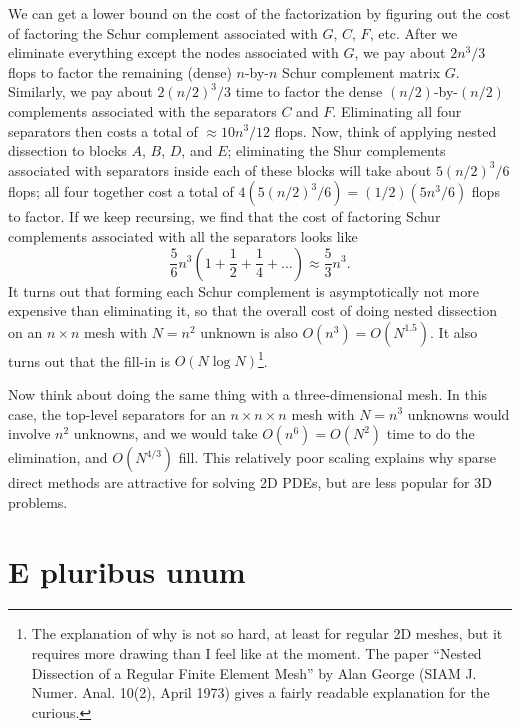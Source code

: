\documentclass[12pt, leqno]{article}
\begin{document}
We can get a lower bound on the cost of the factorization by figuring
out the cost of factoring the Schur complement associated with $G$,
$C$, $F$, etc.  After we eliminate everything except the nodes
associated with $G$, we pay about $2n^3/3$ flops to factor the
remaining (dense) $n$-by-$n$ Schur complement matrix $G$.  Similarly,
we pay about $2(n/2)^3/3$ time to factor the dense $(n/2)$-by-$(n/2)$
complements associated with the separators $C$ and $F$.  Eliminating
all four separators then costs a total of $\approx 10n^3/12$ flops.
Now, think of applying nested dissection to blocks $A$, $B$, $D$, and
$E$; eliminating the Shur complements associated with separators
inside each of these blocks will take about $5(n/2)^3/6$ flops; all
four together cost a total of $4 ( 5(n/2)^3/6 )= (1/2) 
(5n^3/6)$ flops to factor.  If we keep recursing, we find that the
cost of factoring Schur complements associated with all the separators
looks like
\[
  \frac{5}{6} n^3 \left( 1 + \frac{1}{2} + \frac{1}{4} + \ldots \right)
  \approx \frac{5}{3}n^3.
\]
It turns out that forming each Schur complement is asymptotically not
more expensive than eliminating it, so that the overall cost of doing 
nested dissection on an $n \times n$ mesh with $N = n^2$ unknown is also
$O(n^3) = O(N^{1.5})$.  It also turns out that the fill-in is 
$O(N \log N)$\footnote{
  The explanation of why is not so hard, at least for regular 2D meshes, 
  but it requires more drawing than I feel like at the moment.  The paper
  ``Nested Dissection of a Regular Finite Element Mesh'' by Alan George
  (SIAM J. Numer. Anal. 10(2), April 1973) gives a fairly readable explanation
  for the curious.
}.

Now think about doing the same thing with a three-dimensional mesh.
In this case, the top-level separators for an $n \times n \times n$ mesh
with $N = n^3$ unknowns would involve $n^2$ unknowns, and we would take 
$O(n^6) = O(N^2)$ time to do the elimination, and $O(N^{4/3})$ fill.
This relatively poor scaling explains why sparse direct methods are attractive
for solving 2D PDEs, but are less popular for 3D problems.

\section*{E pluribus unum}

\end{document}

